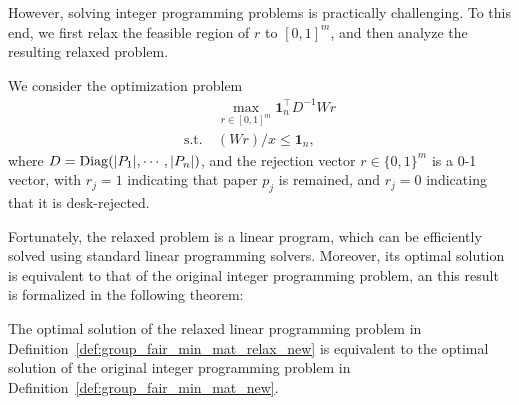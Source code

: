 However, solving integer programming problems is practically challenging. To this end, we first relax the feasible region of $r$ to $[0,1]^m$, and then analyze the resulting relaxed problem.  

\begin{definition}\label{def:group_fair_min_mat_relax_new}
    We consider the optimization problem
    \begin{align*}
    &~ \max_{r \in [0, 1]^m}  \mathbf{1}^\top_nD^{-1}Wr \\ 
        \mathrm{s.t.} 
        & ~ (Wr)/x\le \mathbf{1}_n,
\end{align*}
where $D = \operatorname{Diag}(|P_1|, \cdots, |P_n|)$, and the rejection vector $r \in \{0, 1\}^m$ is a 0-1 vector, with $r_j = 1$ indicating that paper $p_j$ is remained, and $r_j = 0$ indicating that it is desk-rejected. 
\end{definition}

Fortunately, the relaxed problem is a linear program, which can be efficiently solved using standard linear programming solvers. Moreover, its optimal solution is equivalent to that of the original integer programming problem, an this result is formalized in the following theorem:

\begin{theorem}\label{thm:lp_equiv}
    The optimal solution of the relaxed linear programming problem in Definition~\ref{def:group_fair_min_mat_relax_new} is equivalent to the optimal solution of the original integer programming problem in Definition~\ref{def:group_fair_min_mat_new}.
\end{theorem}

